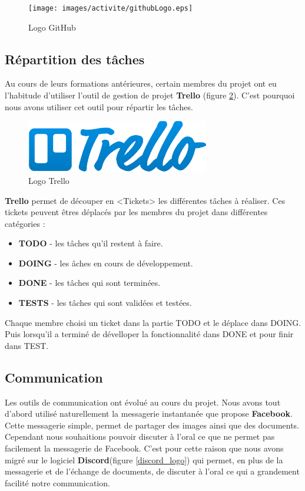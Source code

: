 \begin{figure}[H]
\centering
\texttt{[image: images/activite/githubLogo.eps]}
\caption{Logo GitHub}
\label{github_logo}
\end{figure}



\subsection{Répartition des tâches}
Au cours de leurs formations antérieures, certain membres du projet ont eu l'habitude d'utiliser l'outil de gestion de projet \textbf{Trello} (figure \ref{trello_logo}). C'est pourquoi nous avons utiliser cet outil pour répartir les tâches.\\

\begin{figure}[H]
\centering
\includegraphics[width=8cm]{images/activite/trelloLogo.eps}
\caption{Logo Trello}
\label{trello_logo}
\end{figure}

\textbf{Trello} permet de découper en <Tickets> les différentes t\^aches à réaliser. Ces tickets peuvent \^etres déplacés par les membres du projet dans différentes catégories :

\begin{itemize}
\item \textbf{TODO} - les t\^aches qu'il restent à faire. 
\item \textbf{DOING} - les \^aches en cours de développement.
\item \textbf{DONE} - les t\^aches qui sont terminées.
\item \textbf{TESTS} - les t\^aches qui sont validées et testées.\\
\end{itemize}

Chaque membre choisi un ticket dans la partie TODO et le déplace dans DOING. Puis lorsqu'il a terminé de dévelloper la fonctionnalité dans DONE et pour finir dans TEST.



\subsection{Communication}
Les outils de communication ont évolué au cours du projet. Nous avons tout d'abord utilisé naturellement la messagerie instantanée que propose \textbf{Facebook}. Cette messagerie simple, permet de partager des images ainsi que des documents.
Cependant nous souhaitions pouvoir discuter à l'oral ce que ne permet pas facilement la messagerie de Facebook. C'est pour cette raison que nous avons migré sur le logiciel \textbf{Discord}(figure \ref{discord_logo}) qui permet, en plus de la messagerie et de l'échange de documents, de discuter à l'oral ce qui a grandement facilité notre communication.

